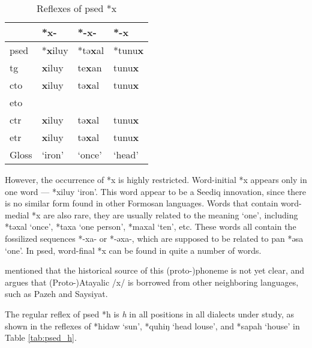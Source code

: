 \begin{table}[!htbp]
\centering
\caption{Reflexes of \acl{psed} *x}
\label{tab:psed_x}
\begin{tabular}{llll}
\hline
           & *x-    & *-x-   & *-x    \\ \hline
\acs{psed} & *\textbf{x}iluy & *tə\textbf{x}al & *tunu\textbf{x} \\ \hdashline
\acs{tg}   & \textbf{x}iluy  & te\textbf{x}an  & tunu\textbf{x}  \\
\acs{cto}  & \textbf{x}iluy  & tə\textbf{x}al  & tunu\textbf{x}  \\
\acs{eto}  &        &        &        \\
\acs{ctr}  & \textbf{x}iluy  & tə\textbf{x}al  & tunu\textbf{x}  \\
\acs{etr}  & \textbf{x}iluy  & tə\textbf{x}al  & tunu\textbf{x}  \\ \hline
Gloss      & `iron' & `once' & `head' \\ \hline
\end{tabular}
\end{table}

However, the occurrence of *x is highly restricted. Word-initial *x appears only in one word --- *xiluy `iron'. This word appear to be a Seediq innovation, since there is no similar form found in other Formosan languages. Words that contain word-medial *x are also rare, they are usually related to the meaning `one', including *təxal `once', *taxa `one person', *maxal `ten', etc. These words all contain the fossilized sequences *-xa- or *-əxa-, which are supposed to be related to \acs{pan} *əsa `one'. In \acl{psed}, word-final *x can be found in quite a number of words. 

\textcite{li1981paic} mentioned that the historical source of this (proto-)phoneme is not yet clear, and \textcite{song2024Aicx} argues that (Proto-)Atayalic /x/ is borrowed from other neighboring languages, such as Pazeh and Saysiyat. 

The regular reflex of \acl{psed} *h is \textit{h} in all positions in all dialects under study, as shown in the reflexes of *hidaw `sun', *quhiŋ `head louse', and *sapah `house' in Table \ref{tab:psed_h}.


